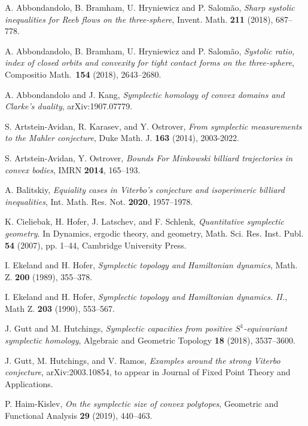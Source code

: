 \documentclass[12pt]{article}
\numberwithin{equation}{section}
\theoremstyle{definition}
\begin{document}
\begin{thebibliography}{12}

 A. Abbondandolo, B. Bramham, U. Hryniewicz and P. Salom\~ao, {\em Sharp systolic inequalities for Reeb flows on the three-sphere\/}, Invent. Math. {\bf 211} (2018), 687--778.

 A. Abbondandolo, B. Bramham, U. Hryniewicz and P. Salom\~ao, {\em Systolic ratio, index of closed orbits and convexity for tight contact forms on the three-sphere\/}, Compositio Math.\ {\bf 154} (2018), 2643--2680.

 A. Abbondandolo and J. Kang, {\em Symplectic homology of convex domains and Clarke's duality\/}, arXiv:1907.07779.

 S. Artstein-Avidan, R. Karasev, and Y. Ostrover, {\em From symplectic measurements to the Mahler conjecture\/}, Duke Math. J. {\bf 163} (2014), 2003-2022.

 S. Artstein-Avidan, Y. Ostrover, \emph{Bounds For Minkowski billiard trajectories in convex bodies}, IMRN {\bf 2014}, 165--193.

 A. Balitskiy, {\em Equiality cases in Viterbo's conjecture and isoperimeric billiard inequalities\/}, Int. Math. Res. Not. {\bf 2020}, 1957--1978.

 K. Cieliebak, H. Hofer, J. Latschev, and F. Schlenk, {\em Quantitative symplectic geometry\/}. In Dynamics, ergodic theory, and geometry, Math. Sci. Res. Inst. Publ. {\bf 54} (2007), pp. 1--44, Cambridge University Press.

 I. Ekeland and H. Hofer, {\em Symplectic topology and Hamiltonian dynamics\/}, Math. Z. {\bf 200} (1989), 355--378.

 I. Ekeland and H. Hofer, {\em Symplectic topology and Hamiltonian dynamics. II.}, Math Z. {\bf 203} (1990), 553--567.

 J. Gutt and M. Hutchings, {\em Symplectic capacities from positive $S^1$-equivariant symplectic homology\/}, Algebraic and Geometric Topology {\bf 18} (2018), 3537--3600.

 J. Gutt, M. Hutchings, and V. Ramos, {\em Examples around the strong Viterbo conjecture\/}, arXiv:2003.10854, to appear in Journal of Fixed Point Theory and Applications.

 P. Haim-Kislev, {\em On the symplectic size of convex polytopes\/}, Geometric and Functional Analysis {\bf 29} (2019), 440--463.


\end{thebibliography}
\end{document}

